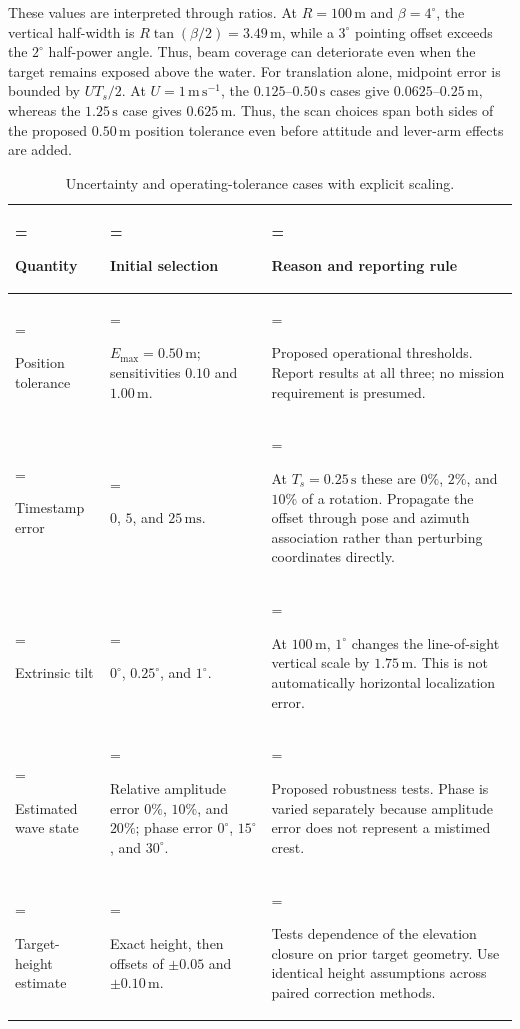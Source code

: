 \documentclass[10pt,letterpaper]{article}
\begin{document}
These values are interpreted through ratios. At $R=100\,\mathrm{m}$ and $\beta=4^\circ$, the vertical half-width is $R\tan(\beta/2)=3.49\,\mathrm{m}$, while a $3^\circ$ pointing offset exceeds the $2^\circ$ half-power angle. Thus, beam coverage can deteriorate even when the target remains exposed above the water. For translation alone, midpoint error is bounded by $UT_s/2$. At $U=1\,\mathrm{m\,s^{-1}}$, the $0.125$--$0.50\,\mathrm{s}$ cases give $0.0625$--$0.25\,\mathrm{m}$, whereas the $1.25\,\mathrm{s}$ case gives $0.625\,\mathrm{m}$. Thus, the scan choices span both sides of the proposed $0.50\,\mathrm{m}$ position tolerance even before attitude and lever-arm effects are added.

\begin{table}[H]
\centering
\caption{Uncertainty and operating-tolerance cases with explicit scaling.}
\label{tab:uncertainty-choices}
\small
\begin{tabularx}{\textwidth}{@{}>{\hsize=0.7\hsize\linewidth=\hsize\raggedright\arraybackslash}X>{\hsize=1.0\hsize\linewidth=\hsize\raggedright\arraybackslash}X>{\hsize=1.3\hsize\linewidth=\hsize\raggedright\arraybackslash}X@{}}
\toprule
Quantity & Initial selection & Reason and reporting rule \\
\midrule
Position tolerance & $E_{\max}=0.50\,\mathrm{m}$; sensitivities $0.10$ and $1.00\,\mathrm{m}$. & Proposed operational thresholds. Report results at all three; no mission requirement is presumed. \\
Timestamp error & $0$, $5$, and $25\,\mathrm{ms}$. & At $T_s=0.25\,\mathrm{s}$ these are $0\%$, $2\%$, and $10\%$ of a rotation. Propagate the offset through pose and azimuth association rather than perturbing coordinates directly. \\
Extrinsic tilt & $0^\circ$, $0.25^\circ$, and $1^\circ$. & At $100\,\mathrm{m}$, $1^\circ$ changes the line-of-sight vertical scale by $1.75\,\mathrm{m}$. This is not automatically horizontal localization error. \\
Estimated wave state & Relative amplitude error $0\%$, $10\%$, and $20\%$; phase error $0^\circ$, $15^\circ$, and $30^\circ$. & Proposed robustness tests. Phase is varied separately because amplitude error does not represent a mistimed crest. \\
Target-height estimate & Exact height, then offsets of $\pm0.05$ and $\pm0.10\,\mathrm{m}$. & Tests dependence of the elevation closure on prior target geometry. Use identical height assumptions across paired correction methods. \\
\bottomrule
\end{tabularx}
\end{table}
\end{document}
